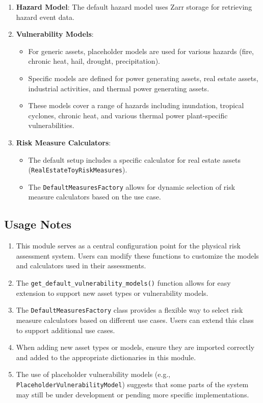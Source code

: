 \documentclass{article}
\begin{document}
\begin{enumerate}
    \item \textbf{Hazard Model}: The default hazard model uses Zarr storage for retrieving hazard event data.

    \item \textbf{Vulnerability Models}: 
    \begin{itemize}
        \item For generic assets, placeholder models are used for various hazards (fire, chronic heat, hail, drought, precipitation).
        \item Specific models are defined for power generating assets, real estate assets, industrial activities, and thermal power generating assets.
        \item These models cover a range of hazards including inundation, tropical cyclones, chronic heat, and various thermal power plant-specific vulnerabilities.
    \end{itemize}

    \item \textbf{Risk Measure Calculators}: 
    \begin{itemize}
        \item The default setup includes a specific calculator for real estate assets (\texttt{RealEstateToyRiskMeasures}).
        \item The \texttt{DefaultMeasuresFactory} allows for dynamic selection of risk measure calculators based on the use case.
    \end{itemize}
\end{enumerate}

\subsection{Usage Notes}

\begin{enumerate}
    \item This module serves as a central configuration point for the physical risk assessment system. Users can modify these functions to customize the models and calculators used in their assessments.

    \item The \texttt{get\_default\_vulnerability\_models()} function allows for easy extension to support new asset types or vulnerability models.

    \item The \texttt{DefaultMeasuresFactory} class provides a flexible way to select risk measure calculators based on different use cases. Users can extend this class to support additional use cases.

    \item When adding new asset types or models, ensure they are imported correctly and added to the appropriate dictionaries in this module.

    \item The use of placeholder vulnerability models (e.g., \texttt{PlaceholderVulnerabilityModel}) suggests that some parts of the system may still be under development or pending more specific implementations.
\end{enumerate}
\end{document}
